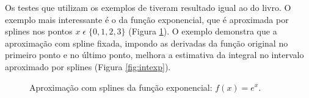 \documentclass[final,5p]{elsarticle}
\numberwithin{equation}{section}
\begin{document}
        Os testes que utilizam os exemplos de \cite{burden2016analise} tiveram resultado igual ao do livro. O exemplo mais interessante é o da função exponencial, que é aproximada por splines nos pontos $x \; \epsilon \; \{0,1, 2, 3\}$ (Figura \ref{fig:exp}). O exemplo demonstra que a aproximação com spline fixada, impondo as derivadas da função original no primeiro ponto e no último ponto, melhora a estimativa da integral no intervalo aproximado por splines (Figura \ref{fig:intexp}).
        
        \begin{figure}[hbt!] 
            \caption{Aproximação com splines da função exponencial: $f(x) = e^x$.}
            \label{fig:exp}
        \end{figure}
                
\end{document}
